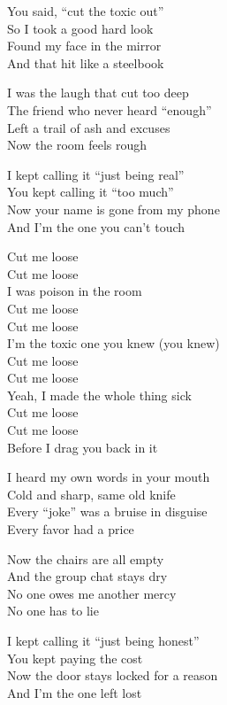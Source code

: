 \begin{lyrics}
You said, “cut the toxic out”\\
So I took a good hard look\\
Found my face in the mirror\\
And that hit like a steelbook

I was the laugh that cut too deep\\
The friend who never heard “enough”\\
Left a trail of ash and excuses\\
Now the room feels rough

I kept calling it “just being real”\\
You kept calling it “too much”\\
Now your name is gone from my phone\\
And I’m the one you can’t touch

Cut me loose\\
Cut me loose\\
I was poison in the room\\
Cut me loose\\
Cut me loose\\
I’m the toxic one you knew
(you knew)\\
Cut me loose\\
Cut me loose\\
Yeah, I made the whole thing sick\\
Cut me loose\\
Cut me loose\\
Before I drag you back in it

I heard my own words in your mouth\\
Cold and sharp, same old knife\\
Every “joke” was a bruise in disguise\\
Every favor had a price

Now the chairs are all empty\\
And the group chat stays dry\\
No one owes me another mercy\\
No one has to lie

I kept calling it “just being honest”\\
You kept paying the cost\\
Now the door stays locked for a reason\\
And I’m the one left lost


\end{lyrics}
